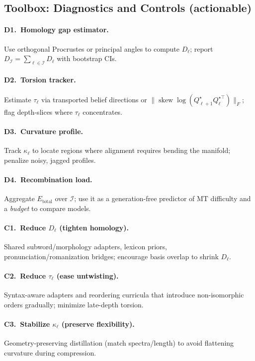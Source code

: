 \subsection*{Toolbox: Diagnostics and Controls (actionable)}
\paragraph{D1.\ Homology gap estimator.} Use orthogonal Procrustes or principal angles to compute $D_\ell$; report $D_{\mathcal I}=\sum_{\ell\in\mathcal I} D_\ell$ with bootstrap CIs.
\paragraph{D2.\ Torsion tracker.} Estimate $\tau_\ell$ via transported belief directions or $\|\operatorname{skew}\log(Q_{\ell+1}^\star Q_\ell^{\star\top})\|_F$; flag depth-slices where $\tau_\ell$ concentrates.
\paragraph{D3.\ Curvature profile.} Track $\kappa_\ell$ to locate regions where alignment requires bending the manifold; penalize noisy, jagged profiles.
\paragraph{D4.\ Recombination load.} Aggregate $E_{\text{total}}$ over $\mathcal I$; use it as a generation-free predictor of MT difficulty and a \emph{budget} to compare models.

\paragraph{C1.\ Reduce $D_\ell$ (tighten homology).} Shared subword/morphology adapters, lexicon priors, pronunciation/romanization bridges; encourage basis overlap to shrink $D_\ell$.
\paragraph{C2.\ Reduce $\tau_\ell$ (ease untwisting).} Syntax-aware adapters and reordering curricula that introduce non-isomorphic orders gradually; minimize late-depth torsion.
\paragraph{C3.\ Stabilize $\kappa_\ell$ (preserve flexibility).} Geometry-preserving distillation (match spectra/length) to avoid flattening curvature during compression.
